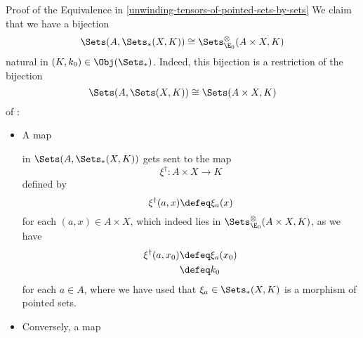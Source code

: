 \begin{Proof}{Proof of the Equivalence in \cref{unwinding-tensors-of-pointed-sets-by-sets}}%
    We claim that we have a bijection
    \[
        \Sets(A,\Sets_{*}(X,K))%
        \cong%
        \Sets^{\otimes}_{\E_{0}}(A\times X,K)%
    \]%
    natural in $(K,k_{0})\in\Obj(\Sets_{*})$. Indeed, this bijection is a restriction of the bijection
    \[
        \Sets(A,\Sets(X,K))%
        \cong
        \Sets(A\times X,K)%
    \]%
    of :%
    \begin{itemize}
        \item A map
            \begin{webcompile}
                \phantom{\xi\colon}
            \end{webcompile}
            in $\Sets(A,\Sets_{*}(X,K))$ gets sent to the map
            \[
                \xi^{\dagger}%
                \colon%
                A\times X%
                \to%
                K%
            \]%
            defined by
            \[
                \xi^{\dagger}(a,x)%
                \defeq%
                \xi_{a}(x)%
            \]%
            for each $(a,x)\in A\times X$, which indeed lies in $\Sets^{\otimes}_{\E_{0}}(A\times X,K)$, as we have%
            \begin{align*}
                \xi^{\dagger}(a,x_{0}) &\defeq \xi_{a}(x_{0})\\%
                                       &\defeq k_{0}%
            \end{align*}
            for each $a\in A$, where we have used that $\xi_{a}\in\Sets_{*}(X,K)$ is a morphism of pointed sets.
        \item Conversely, a map
            \[
\]
\end{itemize}
\end{Proof}
